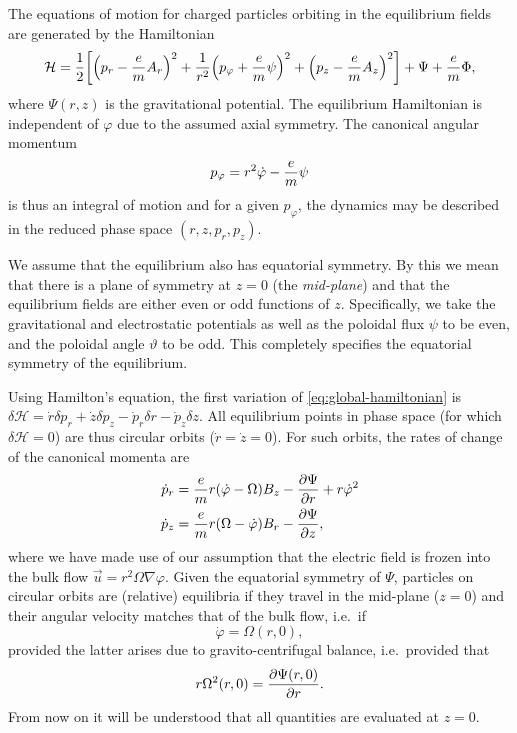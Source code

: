 \documentclass[aps,pre,notitlepage,amsmath,amssymb,amsfonts,nobibnotes,nofootinbib,superscriptaddress]{revtex4-1}
\begin{document}
The equations of motion for charged particles orbiting in the equilibrium
fields are generated by the Hamiltonian
\begin{equation}
  \label{eq:global-hamiltonian}
  \mathcal{H} = \frac{1}{2}\left[
    {\left(p_r - \cm A_r\right)}^2
    + \frac{1}{r^2}{\left(p_\varphi + \cm\psi\right)}^2
    + {\left(p_z - \cm A_z\right)}^2
  \right] + \Psi + \cm\Phi,
\end{equation}
where $\Psi(r,z)$ is the gravitational potential. The equilibrium Hamiltonian
is independent of $\varphi$ due to the assumed axial symmetry. The canonical
angular momentum
\begin{equation}
  \label{eq:canonical-angular-momentum}
  p_\varphi = r^2\dot{\varphi} - \cm\psi
\end{equation}
is thus an integral of motion and for a given $p_\varphi$, the dynamics may be
described in the reduced phase space $(r,z,p_r,p_z)$.

We assume that the equilibrium also has equatorial symmetry. By this we mean
that there is a plane of symmetry at $z=0$ (the \emph{mid-plane}) and that the
equilibrium fields are either even or odd functions of $z$. Specifically, we
take the gravitational and electrostatic potentials as well as the poloidal
flux $\psi$ to be even, and the poloidal angle $\vartheta$ to be odd. This
completely specifies the equatorial symmetry of the equilibrium.

Using Hamilton's equation, the first variation of \cref{eq:global-hamiltonian}
is $\delta\mathcal{H}=\dot{r}\delta{}p_r+\dot{z}\delta{}p_z
-\dot{p}_r\delta{}r-\dot{p}_z\delta{}z$. All equilibrium points in phase space
(for which $\delta\mathcal{H}=0$) are thus circular orbits
($\dot{r}=\dot{z}=0$). For such orbits, the rates of change of the canonical
momenta are
\begin{align}
  \dot{p}_r &= \frac{e}{m} r(\dot{\varphi} - \Omega) B_z
  - \frac{\partial\Psi}{\partial r} + r\dot{\varphi}^2 \\
  \dot{p}_z &= \frac{e}{m} r(\Omega - \dot{\varphi}) B_r
  - \frac{\partial\Psi}{\partial z},
\end{align}
where we have made use of our assumption that the electric field is frozen
into the bulk flow $\vec{u}=r^2\Omega\nabla\varphi$. Given the equatorial
symmetry of $\Psi$, particles on circular orbits are (relative) equilibria if
they travel in the mid-plane ($z=0$) and their angular velocity matches that
of the bulk flow, i.e.\ if
\begin{equation}
  \dot{\varphi} = \Omega(r,0),
\end{equation}
provided the latter arises due to gravito-centrifugal balance, i.e.\ provided
that
\begin{equation}
  r\Omega^2(r,0) = \frac{\partial\Psi(r,0)}{\partial r}.
\end{equation}
From now on it will be understood that all quantities are evaluated at $z=0$.
\end{document}
